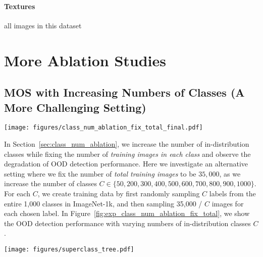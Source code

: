 \documentclass[final]{cvpr}
\begin{document}
\vspace{-0.4cm}
\paragraph{Textures} all images in this dataset
\section{More Ablation Studies}
\subsection{MOS with Increasing Numbers of Classes (A More Challenging Setting)}
\label{app:class_num_ablation_fix_total}
\begin{figure*}[t]
    \centering
    \texttt{[image: figures/class\_num\_ablation\_fix\_total\_final.pdf]}
    \caption{\small{OOD detection performance of MOS (blue) and the MSP baseline (gray). MOS exhibits more stabilized performance as the number of in-distribution classes increases. For each OOD dataset, we show AUROC (\textit{top}) and FPR95 ( \textit{bottom}). Different from Figure~\ref{fig:exp_class_num_ablation_fix_each}, we fix the number of \emph{total training images} instead of the number of \emph{training images in each category} in this experiment.}}
    \vspace{-0.1cm}
    \label{fig:exp_class_num_ablation_fix_total}
\end{figure*}

In Section~\ref{sec:class_num_ablation}, we increase the number of in-distribution classes while fixing the number of \emph{training images in each class} and observe the degradation of OOD detection performance. Here we investigate an alternative setting where we fix the number of \emph{total training images} to be $35,000$, as we increase the number of classes $C\in \{50, 200, 300, 400, 500, 600, 700, 800, 900, 1000\}$. For each $C$, we create training data by first randomly sampling $C$ labels from the entire 1,000 classes in ImageNet-1k, and then sampling 35,000 / $C$ images for each chosen label. In Figure~\ref{fig:exp_class_num_ablation_fix_total}, we show the OOD detection performance with varying numbers of in-distribution classes $C$. 


\begin{figure*}[t]
    \centering
    \texttt{[image: figures/superclass\_tree.pdf]}
    \caption{\small{WordNet hierarchy. Super-classes of ImageNet-1k are based on the leaf nodes (in ellipses) except for \texttt{misc}. The super-class of \texttt{misc} contains 3 leaf nodes: \texttt{abstract entity}, \texttt{matter}, and \texttt{location}.}}
    \label{fig:superclass_tree}
    \vspace{-0.5cm}
\end{figure*}
\end{document}
